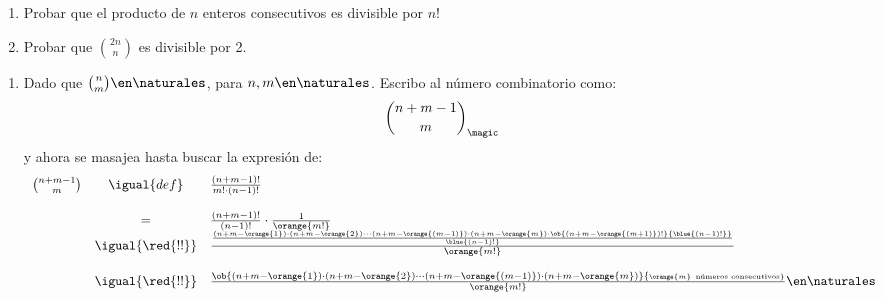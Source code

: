\begin{enunciado}{\ejercicio}
  \begin{enumerate}[label=\alph*)]
    \item Probar que el producto de $n$ enteros consecutivos es divisible por $n!$
    \item Probar que $\binom{2n}{n}$ es divisible por 2.
  \end{enumerate}
\end{enunciado}

\begin{enumerate}[label=\alph*)]
  \item Dado que $\binom{n}{m} \en \naturales$, para $n, m \en \naturales$. Escribo al número combinatorio como:
        $$
          \binom{n + m - 1}{m}_{\text{\magic}}
        $$
        y ahora se masajea hasta buscar la expresión de:
        $$
          \begin{array}{rcl}
            \binom{n + m - 1}{m} & \igual{def}      & \frac{(n + m - 1)!}{m! \cdot (n - 1)!} \\\\
                                 & =                &
            \frac{(n + m - 1)!}{(n - 1)!} \cdot \frac{1}{\orange{m!}}                        \\
                                 & \igual{\red{!!}} &
            \frac{
              \frac{
                (n+m-\orange{1}) \cdot
                (n+m-\orange{2})
                \cdots
                (n + m - \orange{(m - 1)}) \cdot
                (n + m - \orange{m}) \cdot
                \ob{
                  \scriptscriptstyle
                  (n + m - \orange{(m + 1)})!
                }{
                  \scriptscriptstyle
                  \blue{(n-1)!}
                }
              }{\blue{(n-1)!}}
            }{\orange{m!}}                                                                   \\\\
                                 & \igual{\red{!!}} &
            \frac{
              \ob{
                \scriptstyle
                (n + m - \orange{1}) \cdot
                (n + m - \orange{2})
                \cdots
                (n + m - \orange{(m - 1)}) \cdot
                (n + m - \orange{m})
              }{\scriptscriptstyle
                \orange{m} ~ \text{números consecutivos}
              }
            }{\orange{m!}}            \en               \naturales
          \end{array}
        $$


\end{enumerate}
